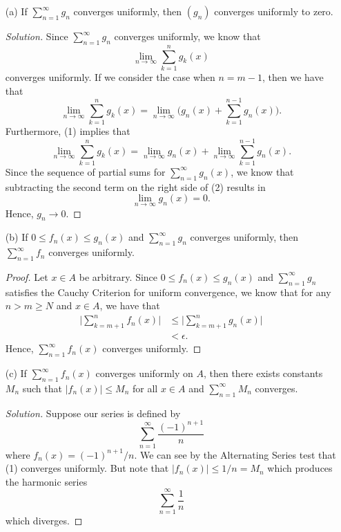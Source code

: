 \begin{enumerate}
    \item[(a)] If \( \sum_{ n=1 }^{ \infty  } g_n  \) converges uniformly, then \( (g_n)  \) converges uniformly to zero.
        \begin{proof}[Solution]
         Since \( \sum_{ n=1 }^{ \infty  } g_n  \) converges uniformly, we know that 
        \[  \lim_{ n \to \infty  } \sum_{ k=1 }^{ n } g_k(x)  \]
        converges uniformly. If we consider the case when \( n = m - 1  \), then we have that 
        \[  \lim_{ n \to \infty  } \sum_{ k=1 }^{ n } g_k(x) = \lim_{ n \to \infty  } \Big( g_n(x) + \sum_{ k=1 }^{ n - 1  } g_n(x)  \Big)  \tag{1}. \]
        Furthermore, (1) implies that 
        \[  \lim_{ n \to \infty  }  \sum_{ k=1 }^{  n } g_k(x) = \lim_{ n \to \infty  }  g_n(x) + \lim_{ n \to \infty  } \sum_{ k=1 }^{ n-1 } g_n(x). \tag{2} \]
        Since the sequence of partial sums for \( \sum_{ n=1 }^{ \infty  } g_n(x)  \), we know that subtracting the second term on the right side of (2) results in 
        \[  \lim_{ n \to \infty  }  g_n(x) = 0. \]
        Hence, \( g_n \to 0  \).
        \end{proof}
        
    \item[(b)] If \( 0 \leq f_n(x) \leq g_n(x)  \) and \( \sum_{ n=1 }^{ \infty  } g_n  \) converges uniformly, then \( \sum_{ n=1 }^{ \infty  } f_n  \) converges uniformly.
        \begin{proof}
        Let \( x \in A  \) be arbitrary. Since \( 0 \leq f_n(x) \leq g_n(x)  \) and \( \sum_{ n=1 }^{ \infty  } g_n  \) satisfies the Cauchy Criterion for uniform convergence, we know that for any \( n > m \geq N  \) and \( x \in A  \), we have that
        \begin{align*}
            \Big| \sum_{ k=m+1 }^{ n } f_n(x)  \Big|  &\leq \Big| \sum_{ k=m+1 }^{ n } g_n(x) \Big| \\ 
                                                      &< \epsilon.
        \end{align*}
        Hence, \( \sum_{ n=1 }^{ \infty  } f_n(x)  \) converges uniformly.
        \end{proof}
    \item[(c)] If \( \sum_{ n=1 }^{ \infty  } f_n(x)  \) converges uniformly on \( A  \), then there exists constants \( M_n  \) such that \( | f_n(x)  | \leq M_n  \) for all \( x \in  A \) and \( \sum_{ n=1 }^{ \infty  } M_n  \) converges.
        \begin{proof}[Solution]
        Suppose our series is defined by 
        \[  \sum_{ n=1 }^{ \infty  } \frac{ (-1)^{n+1}  }{  n } \tag{1}\]
        where \( f_n(x) = (-1)^{n+1} / n  \). We can see by the Alternating Series test that (1) converges uniformly. But note that \( | f_n(x)  | \leq 1 / n = M_n   \) which produces the harmonic series 
        \[  \sum_{ n=1 }^{ \infty  } \frac{ 1 }{ n }  \]
        which diverges.
        
        \end{proof}
\end{enumerate}

